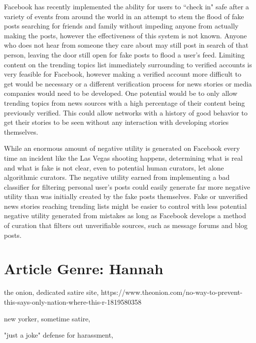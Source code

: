 \documentclass[12pt]{article}
\begin{document}
Facebook has recently implemented the ability for users to ``check in" safe after a variety of events from around the world in an attempt to stem the flood of fake posts searching for friends and family without impeding anyone from actually making the posts, however the effectiveness of this system is not known. Anyone who does not hear from someone they care about may still post in search of that person, leaving the door still open for fake posts to flood a user's feed. Limiting content on the trending topics list immediately surrounding to verified accounts is very feasible for Facebook, however making a verified account more difficult to get would be necessary or a different verification process for news stories or media companies would need to be developed. One potential would be to only allow trending topics from news sources with a high percentage of their content being previously verified. This could allow networks with a history of good behavior to get their stories to be seen without any interaction with developing stories themselves.

While an enormous amount of negative utility is generated on Facebook every time an incident like the Las Vegas shooting happens, determining what is real and what is fake is not clear, even to potential human curators, let alone algorithmic curators. The negative utility earned from implementing a bad classifier for filtering personal user's posts could easily generate far more negative utility than was initially created by the fake posts themselves. Fake or unverified news stories reaching trending lists might be easier to control with less potential negative utility generated from mistakes as long as Facebook develops a method of curation that filters out unverifiable sources, such as message forums and blog posts. 

\section{Article Genre: Hannah}

the onion, dedicated satire site, https://www.theonion.com/no-way-to-prevent-this-says-only-nation-where-this-r-1819580358

new yorker, sometime satire, 

"just a joke" defense for harassment, 
\end{document}
